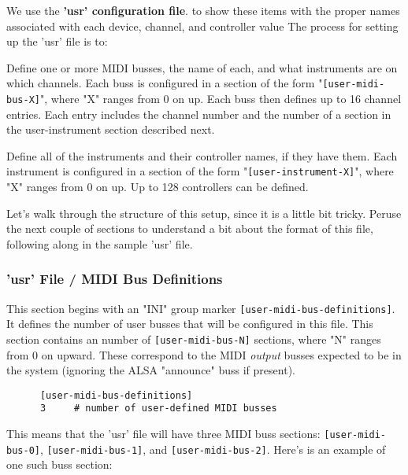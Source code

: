    We use the \textbf{'usr' configuration file}.
   to show these items with the proper
   names associated with each device, channel, and controller value
   The process for setting up the 'usr' file is to:

   \begin{enumber}
      \item Define one or more MIDI busses, the name of each, and what
         instruments are on which channels.  Each buss is configured in a
         section of the form "\texttt{[user-midi-bus-X]}", where "X" ranges
         from 0 on up.  Each buss then defines up to 16 channel entries.
         Each entry includes the channel number and the number of a
         section in the user-instrument section described next.
      \item Define all of the instruments and their controller
         names, if they have them.  Each instrument is configured in a
         section of the form "\texttt{[user-instrument-X]}", where "X"
         ranges from 0 on up.  Up to 128 controllers can be defined.
   \end{enumber}

   Let's walk through the structure of this setup, since it is a little bit
   tricky.  Peruse the next couple of sections to understand a bit about the
   format of this file, following along in the sample 'usr' file.

\subsubsection{'usr' File / MIDI Bus Definitions}
\label{subsubsec:usr_file_midi_bus_definitions}

   This section begins with an
   "INI" group marker \texttt{[user-midi-bus-definitions]}.
   It defines the number of user busses that will be configured in this file.
   This section contains an number
   of \texttt{[user-midi-bus-N]} sections, where "N" ranges from 0 on upward.
   These correspond to the MIDI \textsl{output}
   busses expected to be in the system (ignoring the ALSA "announce" buss if
   present).

   \begin{verbatim}
      [user-midi-bus-definitions]
      3     # number of user-defined MIDI busses
   \end{verbatim}

   This means that the 'usr' file will have three MIDI buss
   sections:
   \texttt{[user-midi-bus-0]},
   \texttt{[user-midi-bus-1]}, and
   \texttt{[user-midi-bus-2]}.
   Here's is an example of one such buss section:

